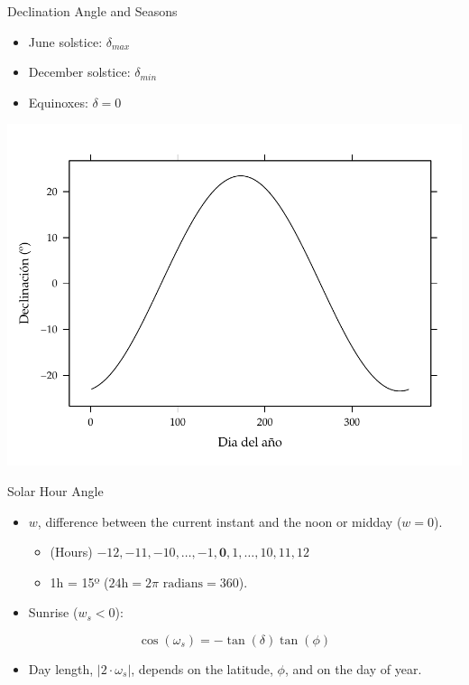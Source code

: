 \documentclass[xcolor={usenames,svgnames,dvipsnames}]{beamer}
\begin{document}
\begin{frame}[label={sec:orgbaf8737}]{Declination Angle and Seasons}
\begin{itemize}
\item June solstice: \(\delta_{max}\)
\item December solstice: \(\delta_{min}\)
\item Equinoxes: \(\delta = 0\)
\end{itemize}

\begin{center}
\includegraphics[width=.9\linewidth]{../figs/Declinacion.pdf}
\end{center}
\end{frame}

\begin{frame}[label={sec:org069c3e9}]{Solar Hour Angle}
\begin{itemize}
\item \(w\), difference between the current instant and the noon or midday (\(w = 0\)).
\begin{itemize}
\item (Hours) \(-12, -11, -10, \dots, -1, \textbf{0}, 1, \dots, 10, 11, 12\)
\item 1h = 15º (\(24\text{h} = 2\pi \text{ radians} = 360\)).
\end{itemize}

\item Sunrise (\(w_s < 0\)):
\end{itemize}
\[
\cos(\omega_{s}) = -\tan(\delta)\tan(\phi)
\]

\begin{itemize}
\item Day length, \(|2 \cdot \omega_s|\), depends on the \alert{latitude}, \(\phi\), and on the \alert{day of year}.
\end{itemize}
\end{frame}
\end{document}
